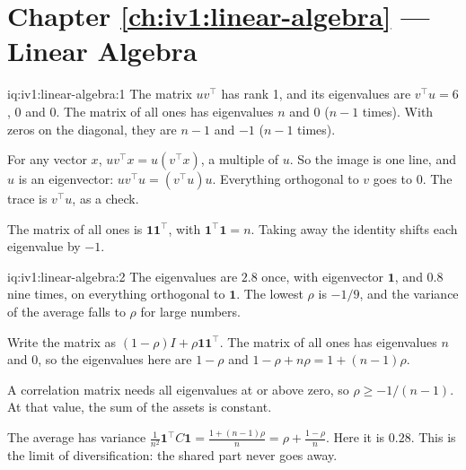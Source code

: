 \section*{Chapter \ref{ch:iv1:linear-algebra} --- Linear Algebra}

\begin{solution}{iq:iv1:linear-algebra:1}
The matrix $uv^\top$ has rank 1, and its eigenvalues are $v^\top u = 6$, 0 and 0. The matrix of all ones has eigenvalues $n$ and $0$ ($n - 1$ times). With zeros on the diagonal, they are $n - 1$ and $-1$ ($n - 1$ times).

For any vector $x$, $uv^\top x = u(v^\top x)$, a multiple of $u$. So the image is one line, and $u$ is an eigenvector: $uv^\top u = (v^\top u)u$. Everything orthogonal to $v$ goes to 0. The trace is $v^\top u$, as a check.

The matrix of all ones is $\mathbf{1}\mathbf{1}^\top$, with $\mathbf{1}^\top\mathbf{1} = n$. Taking away the identity shifts each eigenvalue by $-1$.

\end{solution}

\begin{solution}{iq:iv1:linear-algebra:2}
The eigenvalues are $2.8$ once, with eigenvector $\mathbf{1}$, and $0.8$ nine times, on everything orthogonal to $\mathbf{1}$. The lowest $\rho$ is $-1/9$, and the variance of the average falls to $\rho$ for large numbers.

Write the matrix as $(1 - \rho)I + \rho\mathbf{1}\mathbf{1}^\top$. The matrix of all ones has eigenvalues $n$ and 0, so the eigenvalues here are $1 - \rho$ and $1 - \rho + n\rho = 1 + (n - 1)\rho$.

A correlation matrix needs all eigenvalues at or above zero, so $\rho \ge -1/(n - 1)$. At that value, the sum of the assets is constant.

The average has variance $\frac{1}{n^2}\mathbf{1}^\top C\mathbf{1} = \frac{1 + (n - 1)\rho}{n} = \rho + \frac{1 - \rho}{n}$. Here it is $0.28$. This is the limit of diversification: the shared part never goes away.

\end{solution}

